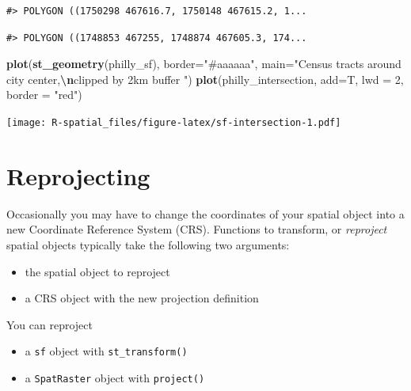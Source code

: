 \documentclass[
]{book}
\newenvironment{Shaded}{\begin{snugshade}}{\end{snugshade}}
\newcommand{\AttributeTok}[1]{\textcolor[rgb]{0.13,0.29,0.53}{#1}}
\newcommand{\DecValTok}[1]{\textcolor[rgb]{0.00,0.00,0.81}{#1}}
\newcommand{\FunctionTok}[1]{\textcolor[rgb]{0.13,0.29,0.53}{\textbf{#1}}}
\newcommand{\NormalTok}[1]{#1}
\newcommand{\SpecialCharTok}[1]{\textcolor[rgb]{0.81,0.36,0.00}{\textbf{#1}}}
\newcommand{\StringTok}[1]{\textcolor[rgb]{0.31,0.60,0.02}{#1}}
\providecommand{\tightlist}{%
  \setlength{\itemsep}{0pt}\setlength{\parskip}{0pt}}
\begin{document}
\begin{verbatim}
#> POLYGON ((1750298 467616.7, 1750148 467615.2, 1...
\end{verbatim}

\begin{verbatim}
#> POLYGON ((1748853 467255, 1748874 467605.3, 174...
\end{verbatim}

\begin{Shaded}
\begin{Highlighting}[]
\FunctionTok{plot}\NormalTok{(}\FunctionTok{st\_geometry}\NormalTok{(philly\_sf), }\AttributeTok{border=}\StringTok{"\#aaaaaa"}\NormalTok{, }\AttributeTok{main=}\StringTok{"Census tracts around city center,}\SpecialCharTok{\textbackslash{}n}\StringTok{clipped by 2km buffer "}\NormalTok{)}
\FunctionTok{plot}\NormalTok{(philly\_intersection, }\AttributeTok{add=}\NormalTok{T, }\AttributeTok{lwd =} \DecValTok{2}\NormalTok{, }\AttributeTok{border =} \StringTok{"red"}\NormalTok{)}
\end{Highlighting}
\end{Shaded}

\texttt{[image: R-spatial\_files/figure-latex/sf-intersection-1.pdf]}

\hypertarget{reprojecting}{%
\section{Reprojecting}\label{reprojecting}}

Occasionally you may have to change the coordinates of your spatial object into a new Coordinate Reference System (CRS). Functions to transform, or \emph{reproject} spatial objects typically take the following two arguments:

\begin{itemize}
\tightlist
\item
  the spatial object to reproject
\item
  a CRS object with the new projection definition
\end{itemize}

You can reproject

\begin{itemize}
\tightlist
\item
  a \texttt{sf} object with \texttt{st\_transform()}\\
\item
  a \texttt{SpatRaster} object with \texttt{project()}
\end{itemize}
\end{document}
